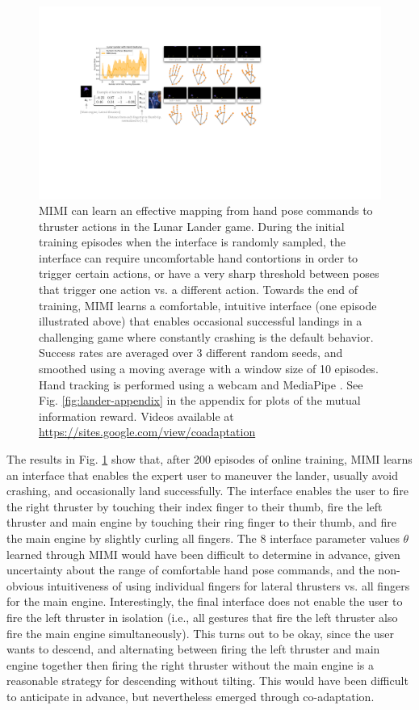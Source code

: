 \documentclass{article}
\begin{document}
\begin{figure}[t]
    \centering
    \includegraphics[width=\linewidth]{lander-online.pdf}
    \caption{MIMI can learn an effective mapping from hand pose commands to thruster actions in the Lunar Lander game. During the initial training episodes when the interface is randomly sampled, the interface can require uncomfortable hand contortions in order to trigger certain actions, or have a very sharp threshold between poses that trigger one action vs. a different action. Towards the end of training, MIMI learns a comfortable, intuitive interface (one episode illustrated above) that enables occasional successful landings in a challenging game where constantly crashing is the default behavior. Success rates are averaged over 3 different random seeds, and smoothed using a moving average with a window size of 10 episodes. Hand tracking is performed using a webcam and MediaPipe \cite{zhang2020mediapipe}. See Fig. \ref{fig:lander-appendix} in the appendix for plots of the mutual information reward. Videos available at \url{https://sites.google.com/view/coadaptation}}
    \label{fig:online-lander}
\end{figure}

The results in Fig. \ref{fig:online-lander} show that, after 200 episodes of online training, MIMI learns an interface that enables the expert user to maneuver the lander, usually avoid crashing, and occasionally land successfully.
The interface enables the user to fire the right thruster by touching their index finger to their thumb, fire the left thruster and main engine by touching their ring finger to their thumb, and fire the main engine by slightly curling all fingers.
The 8 interface parameter values $\theta$ learned through MIMI would have been difficult to determine in advance, given uncertainty about the range of comfortable hand pose commands, and the non-obvious intuitiveness of using individual fingers for lateral thrusters vs. all fingers for the main engine.
Interestingly, the final interface does not enable the user to fire the left thruster in isolation (i.e., all gestures that fire the left thruster also fire the main engine simultaneously).
This turns out to be okay, since the user wants to descend, and alternating between firing the left thruster and main engine together then firing the right thruster without the main engine is a reasonable strategy for descending without tilting.
This would have been difficult to anticipate in advance, but nevertheless emerged through co-adaptation.
\end{document}
